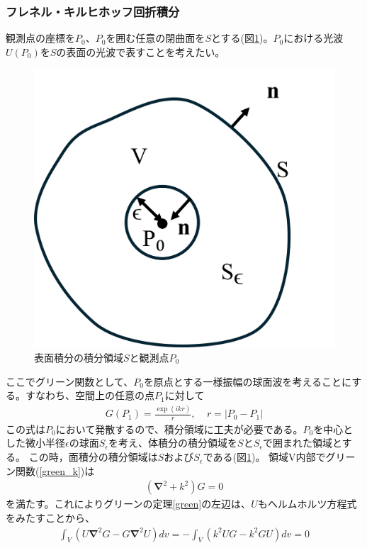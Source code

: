\documentclass[a4paper,11pt,uplatex]{jsbook}
\begin{document}
\subsubsection{フレネル・キルヒホッフ回折積分}
観測点の座標を$P_0$、$P_0$を囲む任意の閉曲面を$S$とする(図\ref{diff_cord})。$P_0$における光波$U(P_0)$を$S$の表面の光波で表すことを考えたい。
\begin{figure}[h]
  \centering
  \includegraphics{image/2-diffraction_cordinate.png}
  \caption[回折積分の座標系]{表面積分の積分領域$S$と観測点$P_0$}\label{diff_cord}
\end{figure}
ここでグリーン関数として、$P_0$を原点とする一様振幅の球面波を考えることにする。すなわち、空間上の任意の点$P_1$に対して
\begin{eqnarray}
  G(P_1) = \frac{\exp(ikr)}{r},~~~~~r = \left|P_0- P_1\right| \label{green_k}
\end{eqnarray}
この式は$P_0$において発散するので、積分領域に工夫が必要である。$P_0$を中心とした微小半径$\epsilon$の球面$S_\epsilon$を考え、体積分の積分領域を$S$と$S_\epsilon$で囲まれた領域とする。
この時，面積分の積分領域は$S$および$S_\epsilon$である(図\ref{diff_cord})。
領域V内部でグリーン関数(\ref{green_k})は
\begin{eqnarray}
  \left(\bm{\nabla}^2 + k^2\right)G = 0 
\end{eqnarray}
を満たす。これによりグリーンの定理\ref{green}の左辺は、$U$もヘルムホルツ方程式をみたすことから、
\begin{eqnarray}
  \int_V \left(U\bm{\nabla}^2G - G\bm{\nabla}^2U\right) dv =  - \int_V \left( k^2UG - k^2GU\right)dv  = 0
\end{eqnarray}
\end{document}
